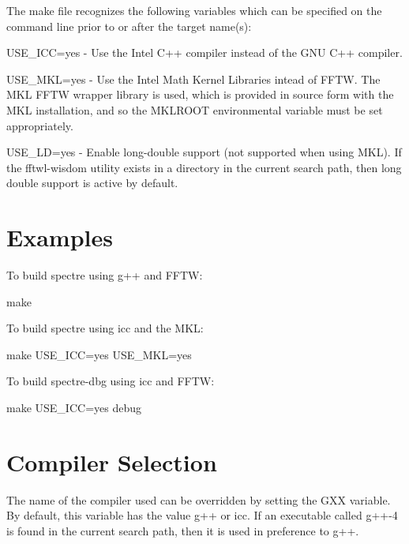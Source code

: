 The make file recognizes the following variables which can be specified on the command line prior to or after the target name(s): \begin{DoxyItemize}
\item USE\_\-ICC=yes -\/ Use the Intel C++ compiler instead of the GNU C++ compiler. \item USE\_\-MKL=yes -\/ Use the Intel Math Kernel Libraries intead of FFTW. The MKL FFTW wrapper library is used, which is provided in source form with the MKL installation, and so the MKLROOT environmental variable must be set appropriately. \item USE\_\-LD=yes -\/ Enable long-\/double support (not supported when using MKL). If the fftwl-\/wisdom utility exists in a directory in the current search path, then long double support is active by default.\end{DoxyItemize}
\hypertarget{building_bexamples}{}\section{Examples}\label{building_bexamples}
To build spectre using g++ and FFTW: 
\begin{DoxyCode}
 make
\end{DoxyCode}


To build spectre using icc and the MKL: 
\begin{DoxyCode}
 make USE_ICC=yes USE_MKL=yes
\end{DoxyCode}


To build spectre-\/dbg using icc and FFTW: 
\begin{DoxyCode}
 make USE_ICC=yes debug
\end{DoxyCode}
\hypertarget{building_compiler}{}\section{Compiler Selection}\label{building_compiler}
The name of the compiler used can be overridden by setting the GXX variable. By default, this variable has the value g++ or icc. If an executable called g++-\/4 is found in the current search path, then it is used in preference to g++. 